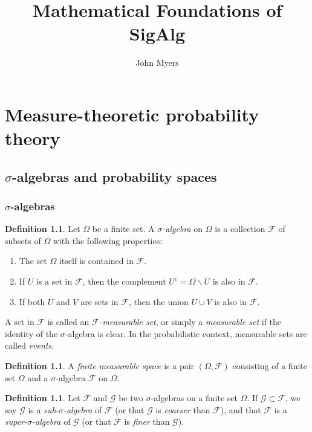 \documentclass[11pt]{book}
\theoremstyle{definition}
\newtheorem{defn}[thm]{Definition}
\numberwithin{equation}{section}
\begin{document}
\title{Mathematical Foundations of SigAlg}
\author{John Myers}

\maketitle

\tableofcontents

\chapter{Measure-theoretic probability theory}

\section{\texorpdfstring{$\sigma$-algebras and probability spaces}{Sigma-algebras and probability spaces}}

\subsection{\texorpdfstring{$\sigma$-algebras}{Sigma-algebras}}

\begin{defn}
	Let $\Omega$ be a finite set. A \textit{$\sigma$-algebra} on $\Omega$ is a collection $\mathcal{F}$ of subsets of $\Omega$ with the following properties:
	\begin{enumerate}
		\item The set $\Omega$ itself is contained in $\mathcal{F}$.
		\item If $U$ is a set in $\mathcal{F}$, then the complement $U^c = \Omega \smallsetminus U$ is also in $\mathcal{F}$.
		\item If both $U$ and $V$ are sets in $\mathcal{F}$, then the union $U\cup V$ is also in $\mathcal{F}$.
	\end{enumerate}
	A set in $\mathcal{F}$ is called an \textit{$\mathcal{F}$-measurable set}, or simply a \textit{measurable set} if the identity of the $\sigma$-algebra is clear. In the probabilistic context, measurable sets are called \textit{events}.
\end{defn}

\begin{defn}
	A \textit{finite measurable space} is a pair $(\Omega, \mathcal{F})$ consisting of a finite set $\Omega$ and a $\sigma$-algebra $\mathcal{F}$ on $\Omega$.
\end{defn}

\begin{defn}
	Let $\mathcal{F}$ and $\mathcal{G}$ be two $\sigma$-algebras on a finite set $\Omega$. If $\mathcal{G} \subset \mathcal{F}$, we say $\mathcal{G}$ is a \textit{sub-$\sigma$-algebra} of $\mathcal{F}$ (or that $\mathcal{G}$ is \textit{coarser} than $\mathcal{F}$), and that $\mathcal{F}$ is a \textit{super-$\sigma$-algebra} of $\mathcal{G}$ (or that $\mathcal{F}$ is \textit{finer} than $\mathcal{G}$).
\end{defn}
\end{document}
